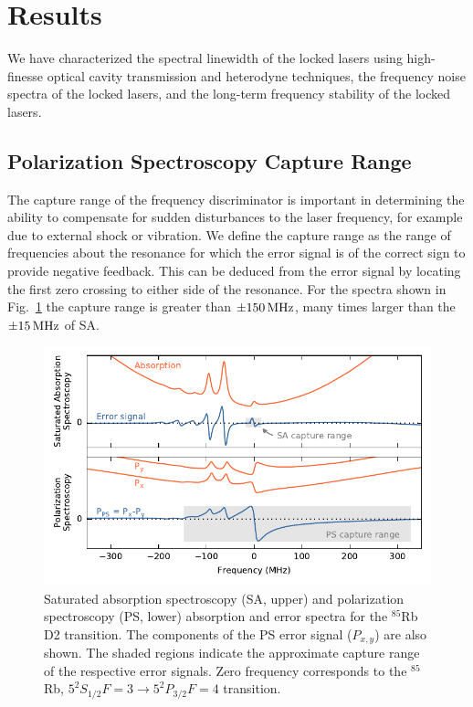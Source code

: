 \documentclass[10pt,letterpaper]{article}
\begin{document}
\section{Results} \label{results_section}

We have characterized the spectral linewidth of the locked lasers using high-finesse optical cavity transmission and heterodyne techniques, the frequency noise spectra of the locked lasers, and the long-term frequency stability of the locked lasers.

\subsection{Polarization Spectroscopy Capture Range}\label{bandwidth_section}
The capture range of the frequency discriminator is important in determining the ability to compensate for sudden disturbances to the laser frequency, for example due to external shock or vibration.
We define the capture range as the range of frequencies about the resonance for which the error signal is of the correct sign to provide negative feedback.
This can be deduced from the error signal by locating the first zero crossing to either side of the resonance.
For the spectra shown in Fig.~\ref{fig:sa_ps_spectra} the capture range is greater than $\pm 150\rm\,MHz$, many times larger than the $\pm 15\rm\,MHz$ of SA.

\begin{figure}[htbp]
    \centering
    \includegraphics{scholten_fig2.pdf}
    \caption{Saturated absorption spectroscopy (SA, upper) and polarization spectroscopy (PS, lower) absorption and error spectra for the $^{85}$Rb D2 transition.
    The components of the PS error signal ($P_{x,y}$) are also shown.
    The shaded regions indicate the approximate capture range of the respective error signals.
    Zero frequency corresponds to the $^{85}$Rb, $5^2S_{1/2} F=3\rightarrow5^2P_{3/2} F=4$ transition.\label{fig:sa_ps_spectra}}
\end{figure}    
\end{document}
